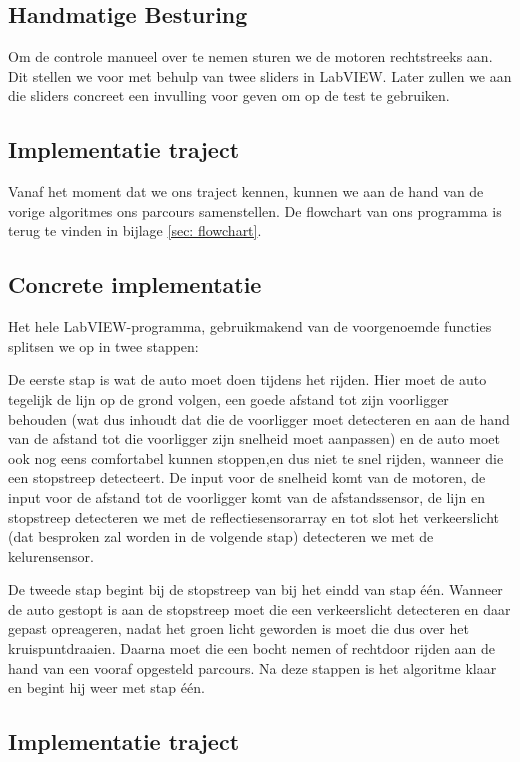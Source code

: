 \documentclass[a4paper,twoside,kulak]{kulakreport}
\begin{document}
\subsection{Handmatige Besturing}
Om de controle manueel over te nemen sturen we de motoren rechtstreeks aan. Dit stellen we voor met behulp van twee sliders in LabVIEW. Later zullen we aan die sliders concreet een invulling voor geven om op de test te gebruiken.

\subsection{Implementatie traject}

Vanaf het moment dat we ons traject kennen, kunnen we aan de hand van de vorige algoritmes ons parcours samenstellen. De flowchart van ons programma is terug te vinden in bijlage \ref{sec: flowchart}.

\subsection{Concrete implementatie}
\bigskip
Het hele LabVIEW-programma, gebruikmakend van de voorgenoemde functies splitsen we op in twee stappen:

De eerste stap is wat de auto moet doen tijdens het rijden. Hier moet de auto tegelijk de lijn op de grond volgen, 
een goede afstand tot zijn voorligger behouden (wat dus inhoudt dat die de voorligger moet detecteren en aan de hand van de afstand tot die voorligger zijn snelheid moet aanpassen) 
en de auto moet ook nog eens comfortabel kunnen stoppen,en dus niet te snel rijden, wanneer die een stopstreep detecteert. 
De input voor de snelheid komt van de motoren, de input voor de afstand tot de voorligger komt van de afstandssensor, de lijn en stopstreep detecteren we met de reflectiesensorarray en tot slot het verkeerslicht (dat besproken zal worden in de volgende stap) detecteren we met de kelurensensor.

De tweede stap begint bij de stopstreep van bij het eindd van stap één. 
Wanneer de auto gestopt is aan de stopstreep moet die een verkeerslicht detecteren en daar gepast opreageren, nadat het groen licht geworden is moet die dus over het kruispuntdraaien. 
Daarna moet die een bocht nemen of rechtdoor rijden aan de hand van een vooraf opgesteld parcours. 
Na deze stappen is het algoritme klaar en begint hij weer met stap één.
	
	\subsection{Implementatie traject}
	
\end{document}
